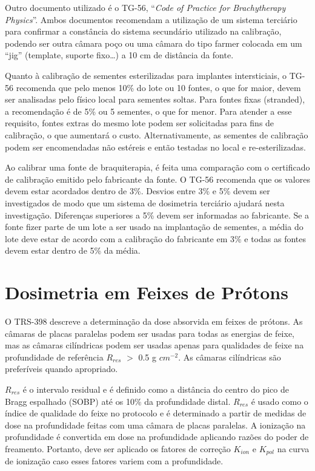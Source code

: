 \documentclass[11pt,a4paper]{article}
\begin{document}
	Outro documento utilizado é o TG-56, ``\textit{Code of Practice for Brachytherapy Physics}''. Ambos documentos recomendam a utilização de um sistema terciário para confirmar a constância do sistema secundário utilizado na calibração, podendo ser outra câmara poço ou uma câmara do tipo farmer colocada em um ``jig'' (template, suporte fixo\dots) a 10 cm de distância da fonte.

	Quanto à calibração de sementes esterilizadas para implantes intersticiais, o TG-56 recomenda que pelo menos 10\% do lote ou 10 fontes, o que for maior, devem ser analisadas pelo físico local para sementes soltas. Para fontes fixas (stranded), a recomendação é de 5\% ou 5 sementes, o que for menor. Para atender a esse requisito, fontes extras do mesmo lote podem ser solicitadas para fins de calibração, o que aumentará o custo. Alternativamente, as sementes de calibração podem ser encomendadas não estéreis e então testadas no local e re-esterilizadas.

	Ao calibrar uma fonte de braquiterapia, é feita uma comparação com o certificado de calibração emitido pelo fabricante da fonte. O TG-56 recomenda que os valores devem estar acordados dentro de 3\%. Desvios entre 3\% e 5\% devem ser investigados de modo que um sistema de dosimetria terciário ajudará nesta investigação. Diferenças superiores a 5\% devem ser informadas ao fabricante. Se a fonte fizer parte de um lote a ser usado na implantação de sementes, a média do lote deve estar de acordo com a calibração do fabricante em 3\% e todas as fontes devem estar dentro de 5\% da média.

\section{Dosimetria em Feixes de Prótons}

	O TRS-398 descreve a determinação da dose absorvida em feixes de prótons. As câmaras de placas paralelas podem ser usadas para todas as energias de feixe, mas as câmaras cilíndricas podem ser usadas apenas para qualidades de feixe na profundidade de referência $R_{res}$ $>$ 0.5 g $cm^{-2}$. As câmaras cilíndricas são preferíveis quando apropriado. 
	
	$R_{res}$ é o intervalo residual e é definido como a distância do centro do pico de Bragg espalhado (SOBP) até os 10\% da profundidade distal. $R_{res}$ é usado como o índice de qualidade do feixe no protocolo e é determinado a partir de medidas de dose na profundidade feitas com uma câmara de placas paralelas. A ionização na profundidade é convertida em dose na profundidade aplicando razões do poder de freamento. Portanto, deve ser aplicado os fatores de correção $K_{ion}$ e $K_{pol}$ na curva de ionização caso esses fatores variem com a profundidade.
\end{document}
